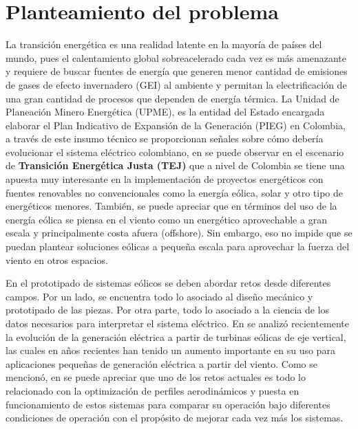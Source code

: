 \documentclass[letterpaper,12pt, oneside]{book}
\begin{document}
\section{Planteamiento del problema} \label{C1:sec2}

La transición energética es una realidad latente en la mayoría de países del mundo, pues el calentamiento global sobreacelerado cada vez es más amenazante y requiere de buscar fuentes de energía que generen menor cantidad de emisiones de gases de efecto invernadero (GEI) al ambiente y permitan la electrificación de una gran cantidad de procesos que dependen de energía térmica. La Unidad de Planeación Minero Energética (UPME), es la entidad del Estado encargada elaborar el Plan Indicativo de Expansión de la Generación (PIEG) en Colombia,  a través de este insumo técnico se proporcionan señales sobre cómo debería evolucionar el sistema eléctrico colombiano, en \cite{ref1} se puede observar en el escenario de \textbf{Transición Energética Justa (TEJ)} que a nivel de Colombia se tiene una apuesta muy interesante en la implementación de proyectos energéticos con fuentes renovables no convencionales como la energía eólica, solar y otro tipo de energéticos menores. También, se puede apreciar que en términos del uso de la energía eólica se piensa en el viento como un energético aprovechable a gran escala y principalmente costa afuera (offshore). Sin embargo, eso no impide que se puedan plantear soluciones eólicas a pequeña escala para aprovechar la fuerza del viento en otros espacios. 

En el prototipado de sistemas eólicos se deben abordar retos desde diferentes campos. Por un lado, se encuentra todo lo asociado al diseño mecánico y prototipado de las piezas. Por otra parte, todo lo asociado a la ciencia de los datos necesarios para interpretar el sistema eléctrico. En \cite{ref2} se analizó recientemente la evolución de la generación eléctrica a partir de turbinas eólicas de eje vertical, las cuales en años recientes han tenido un aumento importante en su uso para aplicaciones pequeñas de generación eléctrica a partir del viento. Como se mencionó, en \cite{ref3} se puede apreciar que uno de los retos actuales es todo lo relacionado con la optimización de perfiles aerodinámicos y puesta en funcionamiento de estos sistemas para comparar su operación bajo diferentes condiciones de operación con el propósito de mejorar cada vez más los sistemas. 
\end{document}
